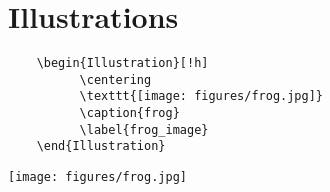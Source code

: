 \chapter{Illustrations}
\begin{verbatim}
	\begin{Illustration}[!h] 
	      \centering
	      \texttt{[image: figures/frog.jpg]} 
	      \caption{frog}
	      \label{frog_image}
	\end{Illustration}
\end{verbatim}
\begin{Illustration}[!h] 
	\centering
	\texttt{[image: figures/frog.jpg]} 
	\caption{frog}
	\label{frog_image}
\end{Illustration}